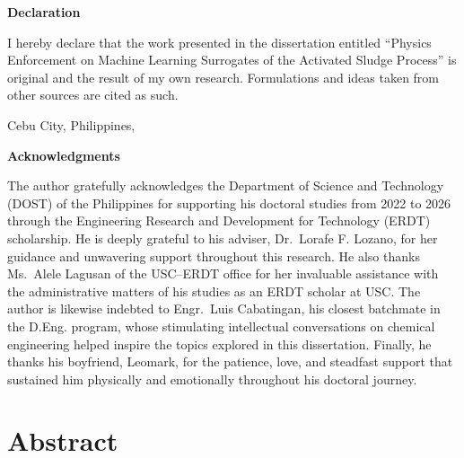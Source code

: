 \documentclass[12pt, twoside]{book}
\makeatletter
\newcommand{\@singlepar@cr}[1][]{\unskip\space\ignorespaces}
\newenvironment{singlepar}{%
    \def\par{\unskip\space\ignorespaces}%
    \def\newline{\unskip\space\ignorespaces}%
    \renewcommand{\\}{\@ifstar{\@singlepar@cr}{\@singlepar@cr}}%
    \ignorespaces
}{%
  \endgraf
}
\newcommand{\thesisYear}{\the\year{}}
\newcommand{\thesisTitle}{Physics Enforcement on Machine Learning Surrogates of the Activated Sludge Process}
\newcommand{\thesisAuthor}{Egberto F. Selerio Jr.}
\newcommand{\thesisPlace}{Cebu City, Philippines}
\makeatother
\begin{document}

\newpage
\pagestyle{plain}

\null
\vfill
{\noindent\bf Declaration}

\begin{singlepar}
    I hereby declare that the work presented in the dissertation entitled \enquote{\thesisTitle} is original
    and the result of my own research. Formulations and ideas taken from other sources are cited as such.
\end{singlepar}

\vspace{3em}

\noindent\thesisPlace, \thesisYear \hfill \makebox[15em]{\hrulefill}
\par\noindent\hfill\makebox[15em][c]{\thesisAuthor}



\newpage
\pagestyle{plain}

\null
\vfill
{\noindent\bf Acknowledgments}

The author gratefully acknowledges the Department of Science and Technology (DOST) of the Philippines for
supporting his doctoral studies from 2022 to 2026 through the Engineering Research and Development for
Technology (ERDT) scholarship. He is deeply grateful to his adviser, Dr.~Lorafe F. Lozano, for her guidance and
unwavering support throughout this research. He also thanks Ms.~Alele Lagusan of the USC--ERDT office for her
invaluable assistance with the administrative matters of his studies as an ERDT scholar at USC. The author is
likewise indebted to Engr.~Luis Cabatingan, his closest batchmate in the D.Eng. program, whose stimulating
intellectual conversations on chemical engineering helped inspire the topics explored in this dissertation.
Finally, he thanks his boyfriend, Leomark, for the patience, love, and steadfast support that sustained him
physically and emotionally throughout his doctoral journey.



\newpage
\section*{Abstract}
\end{document}
